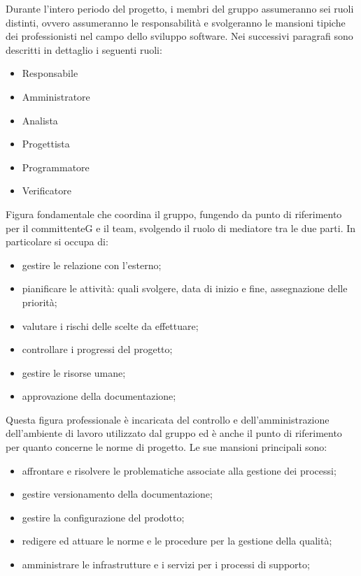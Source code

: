 Durante l’intero periodo del progetto, i membri del gruppo assumeranno sei ruoli distinti, ovvero assumeranno le responsabilità e svolgeranno le mansioni tipiche dei professionisti nel campo dello sviluppo software.
Nei successivi paragrafi sono descritti in dettaglio i seguenti ruoli:
\begin{itemize}
    \item Responsabile
    \item Amministratore
    \item Analista
    \item Progettista
    \item Programmatore
    \item Verificatore
\end{itemize}
Figura fondamentale che coordina il gruppo, fungendo da punto di riferimento per il committenteG e il team, svolgendo il ruolo di mediatore tra le due parti.
In particolare si occupa di:
\begin{itemize}
    \item gestire le relazione con l'esterno;
    \item pianificare le attività: quali svolgere, data di inizio e fine, assegnazione delle priorità;
    \item valutare i rischi delle scelte da effettuare;
    \item controllare i progressi del progetto;
    \item gestire le risorse umane;
    \item approvazione della documentazione;
\end{itemize}
Questa figura professionale è incaricata del controllo e dell’amministrazione dell’ambiente di lavoro utilizzato dal gruppo ed è anche il punto di riferimento per quanto concerne le norme di progetto. Le sue mansioni principali sono:
\begin{itemize}
    \item affrontare e risolvere le problematiche associate alla gestione dei processi;
    \item gestire versionamento della documentazione;
    \item gestire la configurazione del prodotto;
    \item redigere ed attuare le norme e le procedure per la gestione della qualità;
    \item amministrare le infrastrutture e i servizi per i processi di supporto;
\end{itemize}
